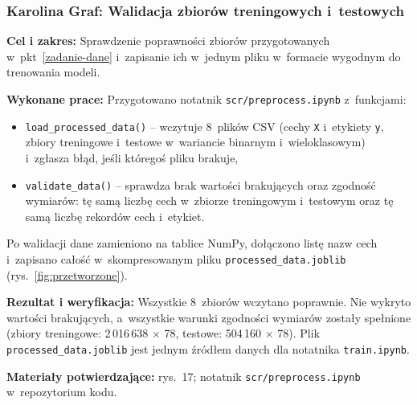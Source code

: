 \documentclass[11pt,a4paper,oneside]{article}
\newcommand{\studentA}{{Karolina Graf}}
\begin{document}
\subsubsection{\studentA: Walidacja zbiorów treningowych i~testowych}\label{zadanie-walidacja}
\textbf{Cel i zakres:} Sprawdzenie poprawności zbiorów przygotowanych w~pkt~\ref{zadanie-dane} i~zapisanie ich w~jednym pliku w~formacie wygodnym do trenowania modeli.\par
\textbf{Wykonane prace:} Przygotowano notatnik \nolinkurl{scr/preprocess.ipynb} z~funkcjami:
\begin{itemize}
\item \texttt{load\_processed\_data()} -- wczytuje 8~plików CSV (cechy \texttt{X} i~etykiety \texttt{y}, zbiory treningowe i~testowe w~wariancie binarnym i~wieloklasowym) i~zgłasza błąd, jeśli któregoś pliku brakuje,
\item \texttt{validate\_data()} -- sprawdza brak wartości brakujących oraz zgodność wymiarów: tę samą liczbę cech w~zbiorze treningowym i~testowym oraz tę samą liczbę rekordów cech i~etykiet.
\end{itemize}
Po walidacji dane zamieniono na tablice NumPy, dołączono listę nazw cech i~zapisano całość w~skompresowanym pliku \nolinkurl{processed_data.joblib} (rys.~\ref{fig:przetworzone}).\par
\textbf{Rezultat i weryfikacja:} Wszystkie 8~zbiorów wczytano poprawnie. Nie wykryto wartości brakujących, a~wszystkie warunki zgodności wymiarów zostały spełnione (zbiory treningowe: 2\,016\,638 $\times$ 78, testowe: 504\,160 $\times$ 78). Plik \nolinkurl{processed_data.joblib} jest jednym źródłem danych dla notatnika \texttt{train.ipynb}.\par
\textbf{Materiały potwierdzające:} rys.~17; notatnik \nolinkurl{scr/preprocess.ipynb} w~repozytorium kodu.

\end{document}
